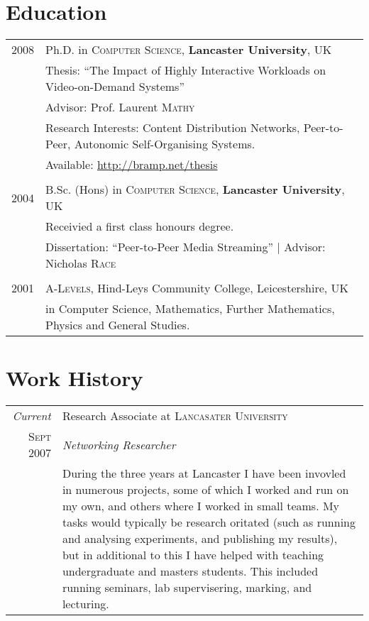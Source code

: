 \documentclass[a4paper,10pt]{article}
\begin{document}
\section{Education}
\begin{tabular}{rl}	
 \textsc{2008} & Ph.D. in \textsc{Computer Science}, \textbf{Lancaster University}, UK\\
& Thesis: ``The Impact of Highly Interactive Workloads on Video-on-Demand Systems''\\
& Advisor: Prof. Laurent \textsc{Mathy}\\
& Research Interests: Content Distribution Networks, Peer-to-Peer, Autonomic Self-Organising Systems.\\
& Available: \href{http://bramp.net/thesis}{http://bramp.net/thesis}\\
&\\

\textsc{2004} & B.Sc. (Hons) in \textsc{Computer Science}, \textbf{Lancaster University}, UK\\
& Receivied a first class honours degree.\\
& Dissertation: ``Peer-to-Peer Media Streaming'' | \small Advisor: Nicholas \textsc{Race}\\
&\\

\textsc{2001} & \textsc{A-Levels}, Hind-Leys Community College, Leicestershire, UK\\
& in Computer Science, Mathematics, Further Mathematics, Physics and General Studies.\\

\end{tabular}

\section{Work History}
\begin{tabular}{r|p{11cm}}
 \emph{Current} & Research Associate at \textsc{Lancasater University} \\
 \textsc{Sept 2007} & \emph{Networking Researcher}\\
&\footnotesize{During the three years at Lancaster I have been invovled in numerous projects, some of which I worked and run on my own, and others where I worked in small teams. My tasks would typically be research oritated (such as running and analysing experiments, and publishing my results), but in additional to this I have helped with teaching undergraduate and masters students. This included running seminars, lab supervisering, marking, and lecturing.}\\


\end{tabular}
\end{document}
